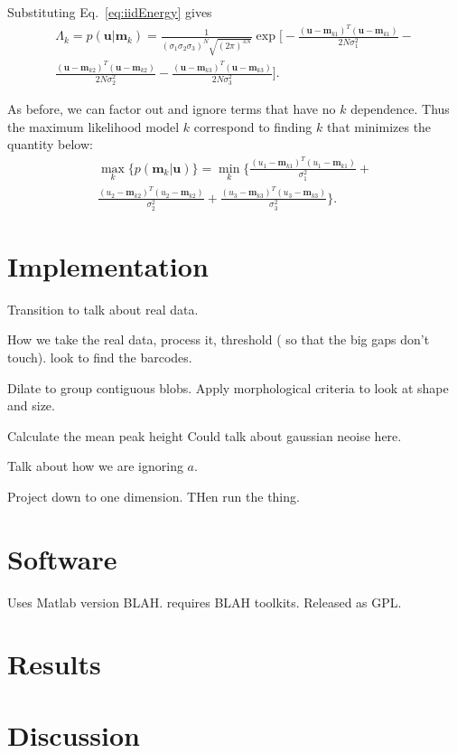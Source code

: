 Substituting Eq.~\ref{eq:iidEnergy} gives
\begin{multline}
\Lambda_k=p(\mathbf{u}|\mathbf{m}_k) =\frac{1}{ (\sigma_1\sigma_2\sigma_3)^N  \sqrt{ (2\pi)^{3N}}  }  \exp\Bigg[ -\frac{(\mathbf{u}-\mathbf{m}_{k1})^T(\mathbf{u}-\mathbf{m}_{k1})} {2 N \sigma_1^2 }   - \\ \frac{(\mathbf{u}-\mathbf{m}_{k2})^T(\mathbf{u}-\mathbf{m}_{k2})} {2 N \sigma_2^2 } -\frac{(\mathbf{u}-\mathbf{m}_{k3})^T(\mathbf{u}-\mathbf{m}_{k3})} {2 N \sigma_3^2 }    \Bigg].
\end{multline}

As before, we can factor out and ignore terms that have no $k$ dependence. Thus the maximum likelihood model $k$ correspond to finding $k$ that minimizes the quantity below:
\begin{multline}
\max_k   \big\{ p(\mathbf{m}_k|\mathbf{u}) \big\} =  \min_k  \Bigg\{  \frac{(u_1-\mathbf{m}_{k1})^T(u_1-\mathbf{m}_{k1})}{\sigma_1^2} +\\  
\frac{(u_2-\mathbf{m}_{k2})^T(u_2-\mathbf{m}_{k2})}{\sigma_2^2} + \frac{(u_3-\mathbf{m}_{k3})^T(u_3-\mathbf{m}_{k3})}{\sigma_3^2} \Bigg\}. 
\end{multline}


\section{Implementation}
Transition to talk about real data.

How we take the real data, process it, threshold ( so that the big gaps don't touch). look to find the barcodes.  

Dilate to group contiguous blobs. Apply morphological criteria to look at shape and size.

Calculate the mean peak height
Could talk about gaussian neoise here.

Talk about how we are ignoring $a$.

Project  down to one dimension.  THen run the thing.


\section{Software}
Uses Matlab version BLAH. requires BLAH toolkits. Released as GPL. 
\section{Results}

\section{Discussion}


